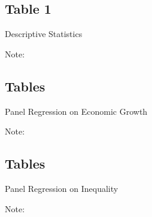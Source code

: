 \documentclass[12 pt,fullpage]{article}
\theoremstyle{plain}
\begin{document}
\begin{comment}
\begin{figure}[h]
	\centering
	\texttt{[image: ./Figures/Figure\_4\_Survey\_Questions.pdf]}
	\caption{Distribution of Survey Responses to Questions Regarding the Mechanism}
\end{figure}
\footnotesize Note: This figure displays answers to an ex-post survey designed to understand the environment and mechanisms behind results. From top-bottom and left to right, the questions are as follows: 1. "Remember your work environment in 2018
and 2019. Consider all the people you used to interact with by e-mail every week. How frequently did you interact withthem face to face? (choose only one option)." 2. "In your opinion, relative to 2018, monitoring from your managers in 2019 increased, decreased, or remained the same?". 3. "Remember your work environment in 2018 and 2019. What was the main reason that you electronically contacted workers from a higher wage band (choose only one option)." 4. "What was the main reason you electronically contacted workers from lower wage bands (choose only one option)."
\end{comment}

\newpage
\subsection{Table 1}
\begin{table}[h!]
	\begin{center}
		\scalebox{0.75}{
			}
		\caption{Descriptive Statistics}
	\end{center}
\end{table}
\footnotesize Note: 

\newpage
\subsection{Tables}
\begin{table}[h!]
	\begin{center}
		\scalebox{0.65}{
			}
		\caption{Panel Regression on Economic Growth}
	\end{center}
\end{table}
\footnotesize Note: 

\newpage
\subsection{Tables}
\begin{table}[h!]
	\begin{center}
		\scalebox{0.65}{
			}
		\caption{Panel Regression on Inequality}
	\end{center}
\end{table}
\footnotesize Note: 
\end{document}
